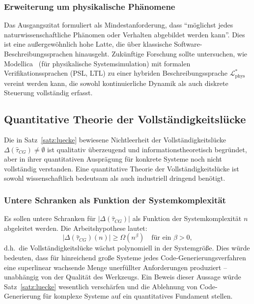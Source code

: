 ﻿\documentclass[a4paper,12pt]{article}
\theoremstyle{definition}
\begin{document}
\subsubsection{Erweiterung um physikalische Phänomene}

Das Ausgangszitat formuliert als Mindestanforderung, dass \enquote{möglichst jedes
naturwissenschaftliche Phänomen oder Verhalten abgebildet werden kann}. Dies ist eine
außergewöhnlich hohe Latte, die über klassische Software-Beschreibungssprachen
hinausgeht. Zukünftige Forschung sollte untersuchen, wie Modellica~\cite{modelica2014}
(für physikalische Systemsimulation) mit formalen Verifikationssprachen (PSL, LTL)
zu einer hybriden Beschreibungssprache $\mathcal{L}^*_{\text{phys}}$ vereint werden
kann, die sowohl kontinuierliche Dynamik als auch diskrete Steuerung vollständig
erfasst.

\subsection{Quantitative Theorie der Vollständigkeitslücke}

Die in Satz~\ref{satz:luecke} bewiesene Nichtleerheit der Vollständigkeitslücke
$\Delta(\hat{\tau}_{CG}) \neq \emptyset$ ist qualitativ überzeugend und informationstheoretisch
begründet, aber in ihrer quantitativen Ausprägung für konkrete Systeme noch nicht
vollständig verstanden. Eine quantitative Theorie der Vollständigkeitslücke ist sowohl
wissenschaftlich bedeutsam als auch industriell dringend benötigt.

\subsubsection{Untere Schranken als Funktion der Systemkomplexität}

Es sollen untere Schranken für $|\Delta(\hat{\tau}_{CG})|$ als Funktion der
Systemkomplexität $n$ abgeleitet werden. Die Arbeitshypothese lautet:
\[
  |\Delta(\hat{\tau}_{CG})(n)| \geq \Omega(n^\beta) \quad \text{für ein } \beta > 0,
\]
d.h.\ die Vollständigkeitslücke wächst polynomiell in der Systemgröße. Dies würde
bedeuten, dass für hinreichend große Systeme jedes Code-Generierungsverfahren
eine superlinear wachsende Menge unerfüllter Anforderungen produziert -- unabhängig
von der Qualität des Werkzeugs. Ein Beweis dieser Aussage würde Satz~\ref{satz:luecke}
wesentlich verschärfen und die Ablehnung von Code-Generierung für komplexe Systeme
auf ein quantitatives Fundament stellen.
\end{document}
